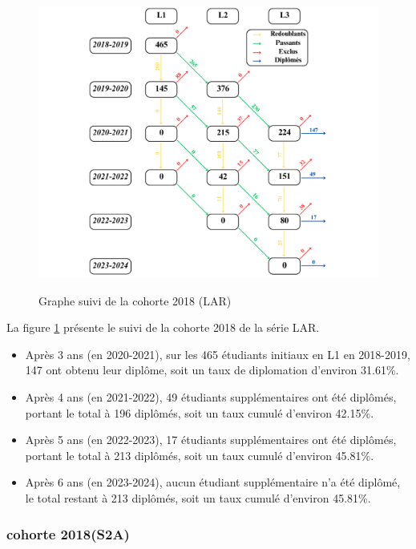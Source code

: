\begin{figure}[ht]
    \centering
    \caption{Graphe suivi de la cohorte 2018 (LAR)}
    \includegraphics[width=1\textwidth]{figure/LAR_2018.png}
    \label{fig:cohorte_lar_2018}
\end{figure}

La figure \ref{fig:cohorte_lar_2018} présente le suivi de la cohorte 2018 de la série LAR.
\begin{itemize}
    \item Après 3 ans (en 2020-2021), sur les 465 étudiants initiaux en L1 en 2018-2019, 147 ont obtenu leur diplôme, soit un taux de diplomation d'environ 31.61\%.
    \item Après 4 ans (en 2021-2022), 49 étudiants supplémentaires ont été diplômés, portant le total à 196 diplômés, soit un taux cumulé d'environ 42.15\%.
    \item Après 5 ans (en 2022-2023), 17 étudiants supplémentaires ont été diplômés, portant le total à 213 diplômés, soit un taux cumulé d'environ 45.81\%.
    \item Après 6 ans (en 2023-2024), aucun étudiant supplémentaire n'a été diplômé, le total restant à 213 diplômés, soit un taux cumulé d'environ 45.81\%.
\end{itemize}

\newpage
\subsubsection{cohorte 2018(S2A)}

